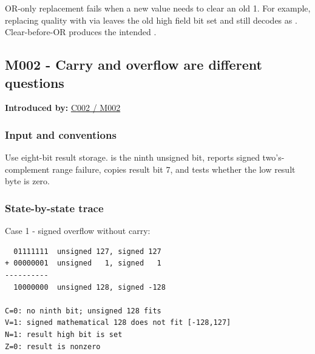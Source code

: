 \hypertarget{appendix-92ff77d4dfdc-boundary-or-failure-trace}{}

OR-only replacement fails when a new value needs to clear an old 1. For example, replacing quality  with  via  leaves the old high field bit set and still decodes as . Clear-before-OR produces the intended .

\subsection{M002 - Carry and overflow are different questions}\label{appendix-92ff77d4dfdc-m002---carry-and-overflow-are-different-questions}

\hypertarget{appendix-92ff77d4dfdc-m002---carry-and-overflow-are-different-questions}{}

\textbf{Introduced by:} \hyperref[01-foundations-i-ch001-arithmetic-becomes-a-policy]{C002 / M002}

\subsubsection{Input and conventions}\label{appendix-92ff77d4dfdc-input-and-conventions-1}

\hypertarget{appendix-92ff77d4dfdc-input-and-conventions-1}{}

Use eight-bit result storage.  is the ninth unsigned bit,  reports signed two's-complement range failure,  copies result bit 7, and  tests whether the low result byte is zero.

\subsubsection{State-by-state trace}\label{appendix-92ff77d4dfdc-state-by-state-trace-1}

\hypertarget{appendix-92ff77d4dfdc-state-by-state-trace-1}{}

Case 1 - signed overflow without carry:

\begin{verbatim}
  01111111  unsigned 127, signed 127
+ 00000001  unsigned   1, signed   1
----------
  10000000  unsigned 128, signed -128

C=0: no ninth bit; unsigned 128 fits
V=1: signed mathematical 128 does not fit [-128,127]
N=1: result high bit is set
Z=0: result is nonzero
\end{verbatim}


